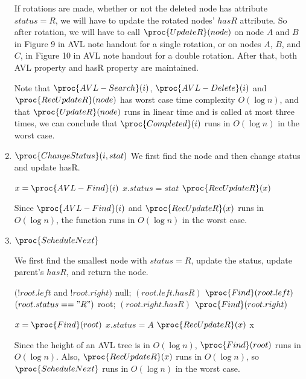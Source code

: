 \documentclass[11pt, answers]{exam}
\theoremstyle{plain}
\theoremstyle{definition}
\begin{document}
\begin{questions}
\begin{solution}
\begin{parts}
\begin{enumerate}
    If rotations are made, whether or not the deleted node has attribute $status=R$, we will have to update the rotated nodes' $hasR$ attribute. So after rotation, we will have to call $\proc{UpdateR}(node)$ on node $A$ and $B$ in Figure 9 in AVL note handout for a single rotation, or on nodes $A$, $B$, and $C$, in Figure 10 in AVL note handout for a double rotation. After that, both AVL property and hasR property are maintained.
    
    Note that $\proc{AVL-Search}(i)$, $\proc{AVL-Delete}(i)$ and $\proc{RecUpdateR}(node)$ has worst case time complexity $O(\log{n})$, and that $\proc{UpdateR}(node)$ runs in linear time and is called at most three times, we can conclude that $\proc{Completed}(i)$ runs in $O(\log{n})$ in the worst case.
    
    \item $\proc{ChangeStatus}(i, stat)$
    We first find the node and then change status and update hasR.
    \begin{codebox}
    \li $x = \proc{AVL-Find}(i)$
    \li $x.status = stat$
    \li $\proc{RecUpdateR}(x)$
    \end{codebox}
    
    Since $\proc{AVL-Find}(i)$ and $\proc{RecUpdateR}(x)$ runs in $O(\log{n})$, the function runs in $O(\log{n})$ in the worst case.
    
    \item $\proc{ScheduleNext}$
    
    We first find the smallest node with $status=R$, update the status, update parent's $hasR$, and return the node.
    \begin{codebox}
    \li \If $(!root.left$ and $ !root.right)$
    \li \Then \Return null;
    \li \ElseIf $(root.left.hasR)$
    \li \Then \Return $\proc{Find}(root.left)$
    \li \ElseIf $(root.status == "R")$
    \li \Then \Return root;
    \li \ElseIf $(root.right.hasR)$
    \li \Then \Return $\proc{Find}(root.right)$
    \end{codebox}
    \begin{codebox}
    \li $x= \proc{Find}(root)$
    \li $x.status = A$
    \li $\proc{RecUpdateR}(x)$
    \li \Return x
    \end{codebox}
    
    Since the height of an AVL tree is in $O(\log{n})$, $\proc{Find}(root)$ runs in $O(\log{n})$. Also, $\proc{RecUpdateR}(x)$ runs in $O(\log{n})$, so $\proc{ScheduleNext}$ runs in $O(\log{n})$ in the worst case.
    

\end{enumerate}
\end{parts}
\end{solution}
\end{questions}
\end{document}
